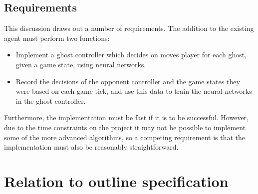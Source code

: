 \subsection{Requirements}

This discussion draws out a number of requirements.  The addition to the existing agent must perform two functions:

\begin{itemize}
\item Implement a ghost controller which decides on moves player for each ghost, given a game state, using neural networks.
\item Record the decisions of the opponent controller and the game states they were based on each game tick, and use this data to train the neural networks in the ghost controller.
\end{itemize}

Furthermore, the implementation must be fast if it is to be successful.  However, due to the time constraints on the project it may not be possible to implement some of the more advanced algorithms, so a competing requirement is that the implementation must also be reasonably straightforward.

\section{Relation to outline specification}
\label{sec:relationoutlinespec}



